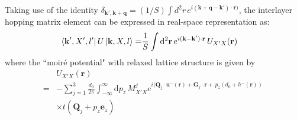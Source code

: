 \documentclass[aps,prx,10pt,twocolumn,superscriptaddress]{revtex4}
\begin{document}
Taking use of the identity $\delta_{\mathbf{k}',\mathbf{k}+\mathbf{q}}=(1/S)\int d^2r \, e^{i(\mathbf{k}+\mathbf{q}-\mathbf{k}')\cdot\mathbf{r})}$,  the interlayer hopping matrix element can be  expressed in real-space representation as:
\begin{equation}
\begin{split}
\bra{\textbf{k}',X',l'}U\ket{\textbf{k},X,l}=&\frac{1}{S}\int\mathrm{d}^{2}\textbf{r}\,e^{i(\textbf{k}-\textbf{k}')\cdot\textbf{r}}\,U_{X'X}(\textbf{r})
\end{split}
\end{equation}
where the ``moir\'e potential" with relaxed lattice structure is given by \cite{koshino-ep-prb20}
\begin{equation}
\begin{split}
&U_{X'X}(\textbf{r})\\
=&-\sum_{j=1}^{3}\frac{d_{0}}{2\pi}\int^{\infty}_{-\infty}\mathrm{d}p_{z}\,M^{j}_{X'X}e^{i(\textbf{Q}_{j}\cdot\textbf{u}^{-}(\textbf{r})+\mathbf{G}_{j}\cdot\textbf{r}+\,p_{z}(d_0+h^{-}(\textbf{r}))}\,\\
&\times t(\textbf{Q}_{j}+p_{z}\textbf{e}_{z})
\end{split}
\end{equation}
\end{document}
